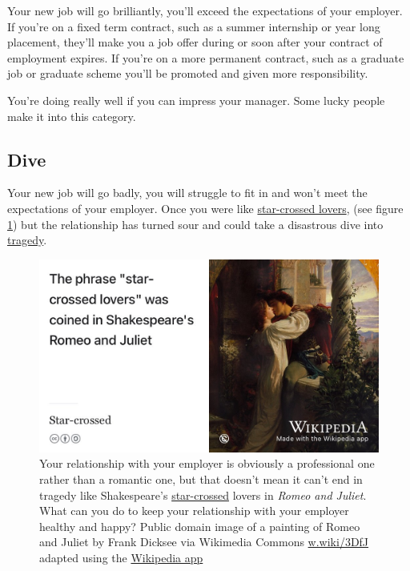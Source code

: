 \documentclass[
]{book}
\begin{document}
Your new job will go brilliantly, you'll exceed the expectations of your employer. If you're on a fixed term contract, such as a summer internship or year long placement, they'll make you a job offer during or soon after your contract of employment expires. If you're on a more permanent contract, such as a graduate job or graduate scheme you'll be promoted and given more responsibility. 💪

You're doing really well if you can impress your manager. Some lucky people make it into this category.

\hypertarget{dive}{%
\subsection{Dive}\label{dive}}

Your new job will go badly, you will struggle to fit in and won't meet the expectations of your employer. Once you were like \href{https://en.wikipedia.org/wiki/Star-crossed}{star-crossed lovers}, (see figure \ref{fig:romeo-fig}) but the relationship has turned sour and could take a disastrous dive into \href{https://en.wikipedia.org/wiki/Tragedy}{tragedy}. \citep{romeo, goblewroe}

\begin{figure}

{\centering \includegraphics[width=1\linewidth]{images/star-crossed-lovers} 

}

\caption{Your relationship with your employer is obviously a professional one rather than a romantic one, but that doesn't mean it can't end in tragedy like Shakespeare's \href{https://en.wikipedia.org/wiki/Star-crossed}{star-crossed} lovers in \emph{Romeo and Juliet}. \citep{romeo} What can you do to keep your relationship with your employer healthy and happy? Public domain image of a painting of Romeo and Juliet by Frank Dicksee via Wikimedia Commons \href{https://w.wiki/3DfJ}{w.wiki/3DfJ} adapted using the \href{https://apps.apple.com/gb/app/wikipedia/id324715238}{Wikipedia app}}\label{fig:romeo-fig}
\end{figure}
\end{document}
